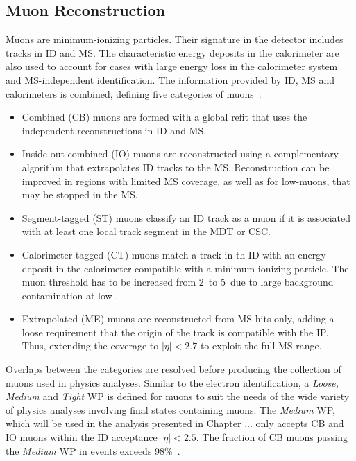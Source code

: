 
\subsection{Muon Reconstruction}
\label{sec:reco:mu}
Muons are minimum-ionizing particles.
Their signature in the detector includes tracks in ID and MS.
The characteristic
energy deposits in the calorimeter are also used to account for cases with large energy loss
in the calorimeter system and MS-independent identification.
The information provided by ID, MS and calorimeters is combined, defining five categories of muons~\cite{MUON-2018-03}:
\begin{itemize}
    \item Combined (CB) muons are formed with a global refit that uses the independent
    reconstructions in ID and MS.
    \item Inside-out combined (IO) muons are reconstructed using a complementary
    algorithm that extrapolates ID tracks to the MS. Reconstruction can be improved in regions with limited MS coverage, as well as for low-\pt muons, that may be stopped in the MS.
    \item Segment-tagged (ST) muons classify an ID track as a muon if it is associated with
    at least one local track segment in the MDT or CSC.
    \item Calorimeter-tagged (CT) muons match a track in th ID with an energy deposit in the
    calorimeter compatible with a minimum-ionizing particle. The muon \pt threshold has to be increased from 2~\GeV to 5~\GeV due to large background contamination at low \pt.
    \item Extrapolated (ME) muons are reconstructed from MS hits only, adding a loose
    requirement that the origin of the track is compatible with the IP. Thus, extending the coverage to $|\eta|< 2.7$ to exploit the full MS range. 
\end{itemize}
Overlaps between the categories are resolved before producing the collection of muons used in physics analyses.
Similar to the electron identification, a \textit{Loose, Medium} and \textit{Tight} WP is defined for muons to suit the needs of the wide variety of physics analyses involving final states containing muons.
The \textit{Medium} WP, which will be used in the analysis presented in Chapter ...
only accepts CB and IO muons within the ID acceptance $|\eta|<2.5$.
The fraction of CB muons passing the \textit{Medium} WP in \ttbar events exceeds 98\%~\cite{MUON-2018-03}.

